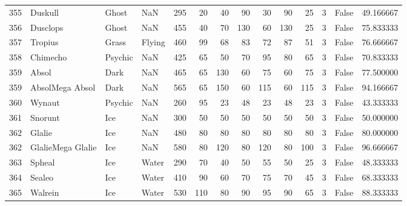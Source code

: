 \begin{tabular}{rlllrrrrrrrrlr}
 355 &                    Duskull &     Ghost &       NaN &    295 &   20 &      40 &       90 &       30 &       90 &     25 &           3 &      False &   49.166667 \\
 356 &                   Dusclops &     Ghost &       NaN &    455 &   40 &      70 &      130 &       60 &      130 &     25 &           3 &      False &   75.833333 \\
 357 &                    Tropius &     Grass &    Flying &    460 &   99 &      68 &       83 &       72 &       87 &     51 &           3 &      False &   76.666667 \\
 358 &                   Chimecho &   Psychic &       NaN &    425 &   65 &      50 &       70 &       95 &       80 &     65 &           3 &      False &   70.833333 \\
 359 &                      Absol &      Dark &       NaN &    465 &   65 &     130 &       60 &       75 &       60 &     75 &           3 &      False &   77.500000 \\
 359 &            AbsolMega Absol &      Dark &       NaN &    565 &   65 &     150 &       60 &      115 &       60 &    115 &           3 &      False &   94.166667 \\
 360 &                     Wynaut &   Psychic &       NaN &    260 &   95 &      23 &       48 &       23 &       48 &     23 &           3 &      False &   43.333333 \\
 361 &                    Snorunt &       Ice &       NaN &    300 &   50 &      50 &       50 &       50 &       50 &     50 &           3 &      False &   50.000000 \\
 362 &                     Glalie &       Ice &       NaN &    480 &   80 &      80 &       80 &       80 &       80 &     80 &           3 &      False &   80.000000 \\
 362 &          GlalieMega Glalie &       Ice &       NaN &    580 &   80 &     120 &       80 &      120 &       80 &    100 &           3 &      False &   96.666667 \\
 363 &                     Spheal &       Ice &     Water &    290 &   70 &      40 &       50 &       55 &       50 &     25 &           3 &      False &   48.333333 \\
 364 &                     Sealeo &       Ice &     Water &    410 &   90 &      60 &       70 &       75 &       70 &     45 &           3 &      False &   68.333333 \\
 365 &                    Walrein &       Ice &     Water &    530 &  110 &      80 &       90 &       95 &       90 &     65 &           3 &      False &   88.333333 \\

\end{tabular}
